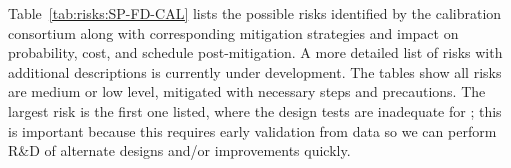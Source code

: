 
Table~\ref{tab:risks:SP-FD-CAL} lists the possible risks identified by the calibration consortium along with corresponding mitigation strategies and impact on probability, cost, and schedule post-mitigation.
A more detailed list of risks with additional descriptions is currently under development. The tables show all risks are medium or low level, mitigated with necessary steps and precautions. The largest risk is the first one listed, where the  design tests are inadequate for ; this is important because this requires early validation from  data so we can perform R\&D of alternate designs and/or improvements quickly.



